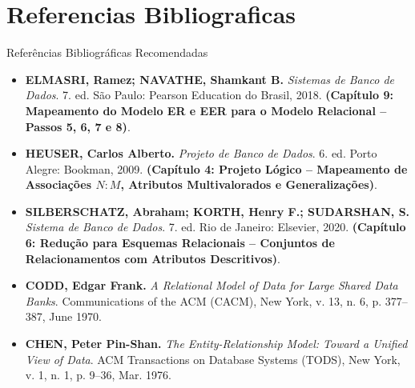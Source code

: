 \section[Referencias]{Referencias Bibliograficas}

\begin{frame}{Referências Bibliográficas Recomendadas}
  \scriptsize
  \begin{itemize}
    \item \textbf{ELMASRI, Ramez; NAVATHE, Shamkant B.} \textit{Sistemas de Banco de Dados}. 7. ed. São Paulo: Pearson Education do Brasil, 2018. \textbf{(Capítulo 9: Mapeamento do Modelo ER e EER para o Modelo Relacional -- Passos 5, 6, 7 e 8)}.
    \item \textbf{HEUSER, Carlos Alberto.} \textit{Projeto de Banco de Dados}. 6. ed. Porto Alegre: Bookman, 2009. \textbf{(Capítulo 4: Projeto Lógico -- Mapeamento de Associações $N:M$, Atributos Multivalorados e Generalizações)}.
    \item \textbf{SILBERSCHATZ, Abraham; KORTH, Henry F.; SUDARSHAN, S.} \textit{Sistema de Banco de Dados}. 7. ed. Rio de Janeiro: Elsevier, 2020. \textbf{(Capítulo 6: Redução para Esquemas Relacionais -- Conjuntos de Relacionamentos com Atributos Descritivos)}.
    \item \textbf{CODD, Edgar Frank.} \textit{A Relational Model of Data for Large Shared Data Banks}. Communications of the ACM (CACM), New York, v. 13, n. 6, p. 377--387, June 1970.
    \item \textbf{CHEN, Peter Pin-Shan.} \textit{The Entity-Relationship Model: Toward a Unified View of Data}. ACM Transactions on Database Systems (TODS), New York, v. 1, n. 1, p. 9--36, Mar. 1976.
  \end{itemize}
\end{frame}
